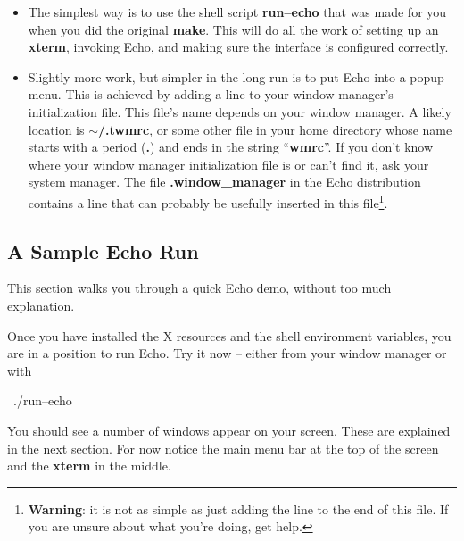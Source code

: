\begin{itemize}

\item
The simplest way is to use the shell script {\bf run--echo} that was
made for you when you did the original {\bf make}.  This will do all
the work of setting up an {\bf xterm}, invoking Echo, and making sure
the interface is configured correctly.

\item
Slightly more work, but simpler in the long run is to put Echo into a
popup menu. This is achieved by adding a line to
your window manager's initialization 
file. This file's name depends on your window manager. A likely
location is {\bf $\sim$/.twmrc}, or some other file in your home
directory whose name starts with a period ({\bf .}) and ends in the
string ``{\bf wmrc}''.  If you don't know where your window manager
initialization file is or can't find it, ask your system manager. The
file {\bf .window\_manager} in the Echo distribution contains a line
that can probably be usefully inserted in this file\footnote{{\bf
Warning}: it is not as simple as just adding the line to the end of
this file. If you are unsure about what you're doing, get help.}.

\end{itemize}

\subsection{A Sample Echo Run}

This section walks you through a quick Echo demo, without too much
explanation.

Once you have installed the X resources and the shell environment
variables, you are in a position to run Echo. Try it now -- either
from your window manager or with

\begin{shell}
\prompt\ ./run--echo
\end{shell}

You should see a number of windows appear on your screen. These are
explained in the next section. For now notice the main menu bar at the
top of the screen and the {\bf xterm} in the middle.

